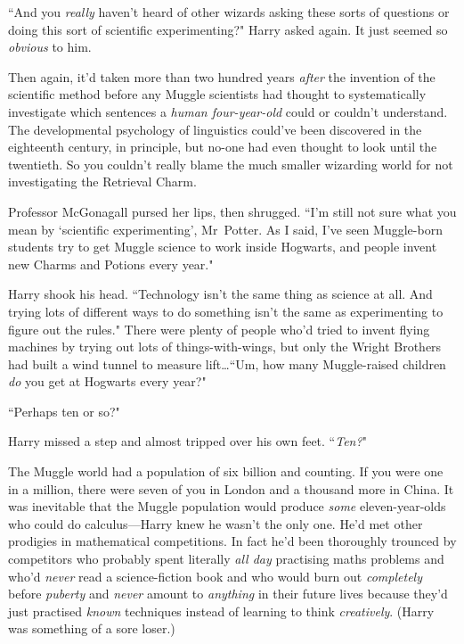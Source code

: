 ``And you \emph{really} haven't heard of other wizards asking these sorts of questions or doing this sort of scientific experimenting?" Harry asked again. It just seemed so \emph{obvious} to him.

Then again, it'd taken more than two hundred years \emph{after} the invention of the scientific method before any Muggle scientists had thought to systematically investigate which sentences a \emph{human four-year-old} could or couldn't understand. The developmental psychology of linguistics could've been discovered in the eighteenth century, in principle, but no-one had even thought to look until the twentieth. So you couldn't really blame the much smaller wizarding world for not investigating the Retrieval Charm.

Professor McGonagall pursed her lips, then shrugged. ``I'm still not sure what you mean by `scientific experimenting', Mr~Potter. As I said, I've seen Muggle-born students try to get Muggle science to work inside Hogwarts, and people invent new Charms and Potions every year."

Harry shook his head. ``Technology isn't the same thing as science at all. And trying lots of different ways to do something isn't the same as experimenting to figure out the rules." There were plenty of people who'd tried to invent flying machines by trying out lots of things-with-wings, but only the Wright Brothers had built a wind tunnel to measure lift…``Um, how many Muggle-raised children \emph{do} you get at Hogwarts every year?"

``Perhaps ten or so?"

Harry missed a step and almost tripped over his own feet. ``\emph{Ten?}"

The Muggle world had a population of six billion and counting. If you were one in a million, there were seven of you in London and a thousand more in China. It was inevitable that the Muggle population would produce \emph{some} eleven-year-olds who could do calculus—Harry knew he wasn't the only one. He'd met other prodigies in mathematical competitions. In fact he'd been thoroughly trounced by competitors who probably spent literally \emph{all day} practising maths problems and who'd \emph{never} read a science-fiction book and who would burn out \emph{completely} before \emph{puberty} and \emph{never} amount to \emph{anything} in their future lives because they'd just practised \emph{known} techniques instead of learning to think \emph{creatively}. (Harry was something of a sore loser.)

